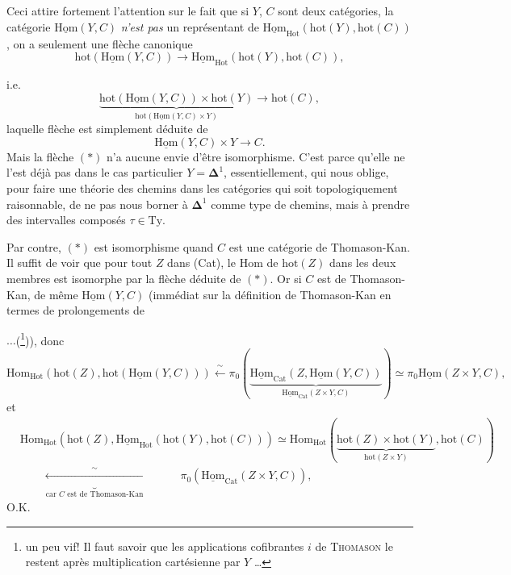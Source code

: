 \documentclass[11pt]{article}
\newcommand{\printedpage}[1]{\marginpar{\footnotesize p.~#1}}
\newcommand{\msp}[1]{\marginpar{\footnotesize [#1]}}
\newcommand{\Hot}{\mathrm{Hot}}
\newcommand{\uHom}{\underline{\mathrm{Hom}}}
\newcommand{\hot}{\mathrm{hot}}
\begin{document}
Ceci attire fortement l'attention sur le fait que si $Y$, $C$ sont deux catégories, la catégorie $\uHom(Y,C)$ \textit{n'est pas} un représentant de $\uHom_{\Hot}(\mathrm{hot}(Y),\mathrm{hot}(C))$, on a seulement une flèche canonique
\[ \mathrm{hot}(\uHom(Y,C)) \longrightarrow \uHom_{\Hot}(\mathrm{hot}(Y),\mathrm{hot}(C)), \tag*{$(*)$} \]

\printedpage{84}

i.e.
\[
\underbrace{\hot(\uHom(Y,C))\times\hot(Y)}_{\hot(\uHom(Y,C)\times Y)}\longrightarrow\hot(C),
\]
laquelle flèche est simplement déduite de
\[
\uHom(Y,C)\times Y\longrightarrow C.
\]
Mais la flèche $(*)$ n'a aucune envie d'être isomorphisme. C'est parce qu'elle ne l'est déjà pas dans le cas particulier $Y=\mathbf{\Delta}^1$, essentiellement, qui nous oblige, pour faire une théorie des chemins dans les catégories qui soit topologiquement raisonnable, de ne pas nous borner à $\mathbf{\Delta}^1$ comme type de chemins, mais à prendre des intervalles composés $\tau\in\mathrm{Ty}$.

\msp{page 136}

Par contre, $(*)$ est isomorphisme quand $C$ est une catégorie de Thomason-Kan. Il suffit de voir que pour tout $Z$ dans (Cat), le Hom de $\hot(Z)$ dans les deux membres est isomorphe par la flèche déduite de $(*)$. Or si $C$ est de Thomason-Kan, de même $\uHom(Y,C)$ (immédiat sur la définition de Thomason-Kan en termes de prolongements de
$\ldots$(\footnote[29]{un peu vif! Il faut savoir que les applications cofibrantes $i$ de \textsc{Thomason} le restent après multiplication cartésienne par $Y$ \ldots})), donc
\[
\mathrm{Hom}_{\mathrm{Hot}}(\hot(Z),\hot(\uHom(Y,C)))\xleftarrow{\ \sim\ }\pi_0(\underbrace{\uHom_{\mathrm{Cat}}(Z,\uHom(Y,C))}_{\uHom_{\mathrm{Cat}}(Z\times Y,C)})\simeq\pi_0\uHom(Z\times Y,C), %
\]
et
\[
\begin{aligned}
&\mathrm{Hom}_{\mathrm{Hot}}(\hot(Z),\uHom_{\mathrm{Hot}}(\hot(Y),\hot(C)))\simeq\mathrm{Hom}_{\mathrm{Hot}}(\underbrace{\hot(Z)\times\hot(Y)}_{\hot(Z\times Y)},\hot(C))\\
&\qquad\underbrace{\xleftarrow{\ \sim\ }}_{\text{car $C$ est de Thomason-Kan}}\qquad\quad\pi_0(\uHom_{\mathrm{Cat}}(Z\times Y,C)),
\end{aligned}
\]
O.K.
\end{document}

